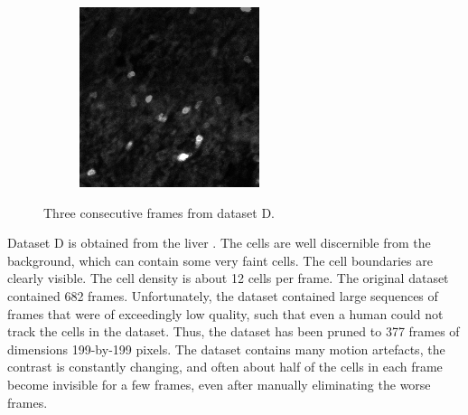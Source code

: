 \begin{figure}[h]
\begin{subfigure}{.32\textwidth}
		\end{subfigure}
		\hfill
		\begin{subfigure}{.32\textwidth}
		\includegraphics[width=\textwidth]{images/series14croppedclean027}
		\end{subfigure}
		\caption{Three consecutive frames from dataset D.}
		\label{fig:data_datasetD}
	\end{figure}

	Dataset D is obtained from the liver . The cells are well discernible from the background, which can contain some very faint cells. The cell boundaries are clearly visible. The cell density is about 12 cells per frame. The original dataset contained 682 frames. Unfortunately, the dataset contained large sequences of frames that were of exceedingly low quality, such that even a human could not track the cells in the dataset. Thus, the dataset has been pruned to 377 frames of dimensions 199-by-199 pixels. The dataset contains many motion artefacts, the contrast is constantly changing, and often about half of the cells in each frame become invisible for a few frames, even after manually eliminating the worse frames.
	
